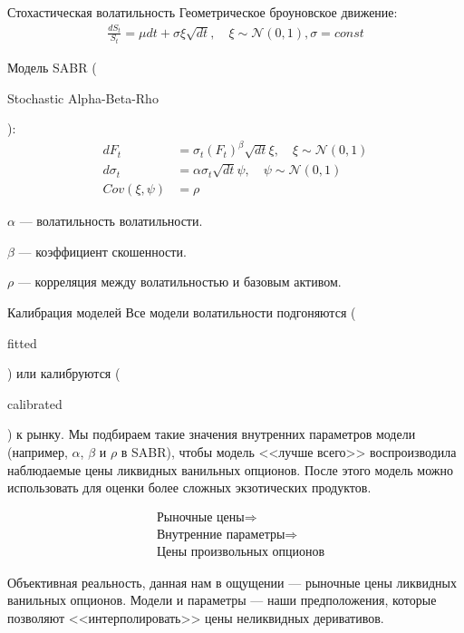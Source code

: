 \documentclass{beamer}
\newcommand{\en}[1]{\begin{otherlanguage}{english}#1\end{otherlanguage}}
\begin{document}
\begin{frame}{Стохастическая волатильность}
\justify
Геометрическое броуновское движение:
\begin{align*}
\frac{dS_t}{S_t} = \mu dt + \sigma\xi\sqrt{dt}, \quad \xi \sim \mathcal{N}(0, 1), \sigma = const
\end{align*}

\justify
Модель SABR (\en{Stochastic Alpha-Beta-Rho}):
\begin{align*}
dF_t &= \sigma_t(F_t)^\beta \sqrt{dt}\xi, \quad \xi \sim \mathcal{N}(0, 1) \\
d\sigma_t &= \alpha\sigma_t\sqrt{dt}\psi, \quad \psi \sim \mathcal{N}(0, 1) \\
Cov(\xi, \psi) &= \rho
\end{align*}

\justify
$\alpha$ --- волатильность волатильности.

$\beta$ --- коэффициент скошенности.

$\rho$ --- корреляция между волатильностью и базовым активом.
\end{frame}



\begin{frame}{Калибрация моделей}
\justify
Все модели волатильности подгоняются (\en{fitted}) или калибруются (\en{calibrated}) к рынку. Мы подбираем такие значения внутренних параметров модели (например, $\alpha$, $\beta$ и $\rho$ в SABR), чтобы модель <<лучше всего>> воспроизводила наблюдаемые цены ликвидных ванильных опционов. После этого модель можно использовать для оценки более сложных экзотических продуктов.

\begin{align*}
&\text{Рыночные цены} \Rightarrow \\
&\text{Внутренние параметры} \Rightarrow \\
&\text{Цены произвольных опционов}
\end{align*}

\justify
Объективная реальность, данная нам в ощущении --- рыночные цены ликвидных ванильных опционов. Модели и параметры --- наши предположения, которые позволяют <<интерполировать>> цены неликвидных деривативов.
\end{frame}
\end{document}

